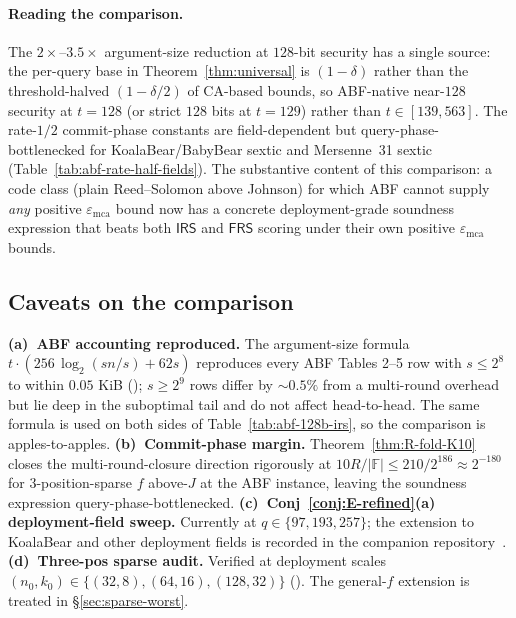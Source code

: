 \documentclass[11pt]{article}
\theoremstyle{definition}
\theoremstyle{remark}
\newcommand{\FF}{\mathbb{F}}
\begin{document}
\paragraph{Reading the comparison.}
The $2{\times}$--$3.5{\times}$ argument-size reduction at $128$-bit
security has a single source: the per-query base in
Theorem~\ref{thm:universal} is $(1{-}\delta)$ rather than the
threshold-halved $(1{-}\delta/2)$ of CA-based bounds, so ABF-native
near-$128$ security at $t = 128$ (or strict $128$ bits at $t=129$)
rather than $t \in [139, 563]$. The rate-$1/2$ commit-phase constants
are field-dependent but query-phase-bottlenecked for KoalaBear/BabyBear
sextic and Mersenne~31 sextic (Table~\ref{tab:abf-rate-half-fields}).
The
substantive content of this comparison: a code class
(plain Reed--Solomon above Johnson) for which ABF cannot supply
\emph{any} positive $\varepsilon_{\mathrm{mca}}$ bound now has a
concrete deployment-grade soundness expression that beats both
$\mathsf{IRS}$ and $\mathsf{FRS}$ scoring under their own positive
$\varepsilon_{\mathrm{mca}}$ bounds.

\subsection{Caveats on the comparison}
\label{ssec:p0-caveats}

\textbf{(a)~ABF accounting reproduced.} The argument-size formula
$t \cdot (256\,\log_2(sn/s) + 62 s)$ reproduces every ABF Tables 2--5
row with $s \leq 2^{8}$ to within $0.05$ KiB
(\cite{CompanionRepo}); $s \geq 2^9$ rows differ by ${\sim}0.5\%$
from a multi-round overhead but lie deep in the suboptimal tail and
do not affect head-to-head. The same formula is used on both sides
of Table~\ref{tab:abf-128b-irs}, so the comparison is
apples-to-apples.
\textbf{(b)~Commit-phase margin.}
Theorem~\ref{thm:R-fold-K10} closes the multi-round-closure direction
rigorously at $10R/|\FF| \leq 210/2^{186} \approx 2^{-180}$ for
$3$-position-sparse $f$ above-$J$ at the ABF instance, leaving the
soundness expression query-phase-bottlenecked.
\textbf{(c)~Conj~\ref{conj:E-refined}(a) deployment-field sweep.}
Currently at $q \in \{97, 193, 257\}$; the extension to KoalaBear and
other deployment fields is recorded in the companion
repository~\cite{CompanionRepo}.
\textbf{(d)~Three-pos sparse audit.} Verified at deployment scales
$(n_0, k_0) \in \{(32, 8), (64, 16), (128, 32)\}$
(\cite{CompanionRepo}). The general-$f$ extension is treated in
\S\ref{sec:sparse-worst}.

\end{document}
